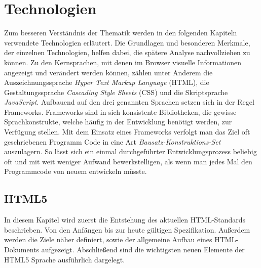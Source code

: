 \section{Technologien}\label{technologien}
Zum besseren Verständnis der Thematik werden in den folgenden Kapiteln verwendete Technologien erläutert. Die Grundlagen und besonderen Merkmale, der einzelnen Technologien, helfen dabei, die spätere Analyse nachvollziehen zu können. Zu den Kernsprachen, mit denen im Browser visuelle Informationen angezeigt und verändert werden können, zählen unter Anderem die Auszeichnungssprache \textit{Hyper Text Markup Language} (HTML), die Gestaltungssprache \textit{Cascading Style Sheets} (CSS) und die Skriptsprache \textit{JavaScript}. Aufbauend auf den drei genannten Sprachen setzen sich in der Regel Frameworks. Frameworks sind in sich konsistente Bibliotheken, die gewisse Sprachkonstrukte, welche häufig in der Entwicklung benötigt werden, zur Verfügung stellen. Mit dem Einsatz eines Frameworks verfolgt man das Ziel oft geschriebenen Programm Code in eine Art \textit{Bausatz-Konstruktions-Set} auszulagern. So lässt sich ein einmal durchgeführter Entwicklungsprozess beliebig oft und mit weit weniger Aufwand bewerkstelligen, als wenn man jedes Mal den Programmcode von neuem entwickeln müsste.

\subsection{HTML5}
In diesem Kapitel wird zuerst die Entstehung des aktuellen HTML-Standards beschrieben. Von den Anfängen bis zur heute gültigen Spezifikation. Außerdem werden die Ziele näher definiert, sowie der allgemeine Aufbau eines HTML-Dokuments aufgezeigt. Abschließend sind die wichtigsten neuen Elemente der HTML5 Sprache ausführlich dargelegt.

